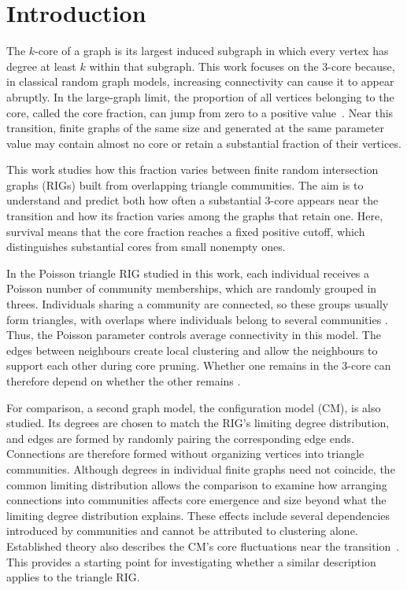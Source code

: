 \section{Introduction}
\label{sec:introduction}

The $k$-core of a graph is its largest induced subgraph in which every vertex
has degree at least $k$ within that subgraph. This work focuses on the
$3$-core because, in classical random graph models, increasing connectivity
can cause it to appear abruptly. In the large-graph limit, the proportion of
all vertices belonging to the core, called the core fraction, can jump from
zero to a positive value~\cite{janson2007kcore}. Near this transition,
finite graphs of the same size and generated at the same parameter value may
contain almost no core or retain a substantial fraction of their vertices.

This work studies how this fraction varies between finite random
intersection graphs (RIGs) built from overlapping triangle communities.
The aim is to understand and predict both how often a substantial $3$-core
appears near the transition
and how its fraction varies among the graphs that retain one. Here, survival
means that the core fraction reaches a fixed positive cutoff, which
distinguishes substantial cores from small nonempty ones.

In the Poisson triangle RIG studied in this work, each individual receives
a Poisson number of community memberships, which are randomly grouped in threes.
Individuals sharing a community are connected, so these groups usually form
triangles, with overlaps where individuals belong to several communities
\cite{hofstad2021communities}. Thus, the Poisson parameter controls average
connectivity in this model. The edges between neighbours create local clustering
and allow the neighbours to support each other during core pruning. Whether one
remains in the $3$-core can therefore depend on whether the other remains
\cite{gleeson2009clustered,bhat2017clustered}.

For comparison, a second graph model, the configuration model (CM), is also
studied. Its degrees are chosen to match the RIG's limiting degree
distribution, and edges are formed by randomly pairing the corresponding
edge ends. Connections are therefore formed without organizing vertices
into triangle communities. Although degrees in individual finite graphs
need not coincide, the common limiting distribution allows the comparison
to examine how arranging connections into communities affects core emergence
and size beyond what
the limiting degree distribution explains. These effects include several
dependencies introduced by communities and cannot be attributed to
clustering alone. Established theory also describes the CM's core fluctuations
near the transition~\cite{janson2008fluctuations}. This provides a starting
point for investigating whether a similar description applies to the
triangle RIG.

